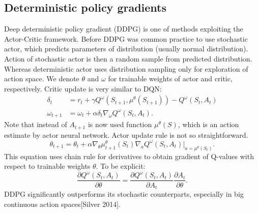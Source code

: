 \subsection{Deterministic policy gradients}
Deep deterministic policy gradient (DDPG) is one of methods exploiting the Actor-Critic framework. Before DDPG was common practice to use stochastic actor, which predicts parameters of distribution (usually normal distribution). Action of stochastic actor is then a random sample from predicted distribution. Whereas deterministic actor uses distribution sampling only for exploration of action space. We denote $\theta$ and $\omega$ for trainable weights of actor and critic, respectively. Critic update is very similar to DQN:
\begin{align}
\delta_t &= r_t + \gamma Q^\omega(S_{t+1}, \mu ^\theta (S_{t+1})) - Q^\omega(S_t, A_t)\\
\omega_{t+1} &= \omega_t + \alpha \delta_t \nabla_\omega Q^\omega(S_t, A_t).
\end{align}
Note that instead of $A_{t+1}$ is now used function $\mu^\theta(S)$, which is an action estimate by actor neural network. Actor update rule is not so straightforward. 
\begin{equation}
\theta_{t+1} = \theta_t + \alpha\nabla_\theta \mu_{t+1}^\theta(S_t)\nabla_a Q^\omega (S_t, A_t)|_{a = \mu^\theta(S_t)}.
\end{equation}
This equation uses chain rule for derivatives to obtain gradient of Q-values with respect to trainable weights $\theta$. To be explicit:
\begin{equation}
\frac{\partial Q^\omega(S_t, A_t)}{\partial \theta} = \frac{\partial Q^\omega(S_t, A_t)}{\partial A_t} \frac{\partial A_t}{\partial \theta}.
\end{equation}
DDPG significantly outperforms its stochastic counterparts, especially in big continuous action spaces[Silver 2014].

